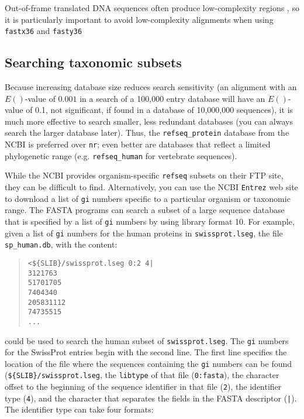\documentclass[11pt]{article}
\begin{document}
Out-of-frame translated DNA sequences often produce low-complexity
regions \cite{wrp973}, so it is particularly important to avoid
low-complexity alignments when using \texttt{fastx36} and
\texttt{fasty36}

\subsection{Searching taxonomic subsets}

Because increasing database size reduces search sensitivity (an
alignment with an $E()$-value of $0.001$ in a search of a 100,000
entry database will have an $E()$-value of 0.1, not significant, if
found in a database of 10,000,000 sequences), it is much more
effective to search smaller, less redundant databases (you can always
search the larger database later).  Thus, the \texttt{refseq\_protein}
database from the NCBI is preferred over \texttt{nr}; even better are
databases that reflect a limited phylogenetic range
(e.g. \texttt{refseq\_human} for vertebrate sequences).

While the NCBI provides organism-specific \texttt{refseq} subsets on
their FTP site, they can be difficult to find.  Alternatively, you can
use the NCBI \texttt{Entrez} web site to download a list of
\texttt{gi} numbers specific to a particular organism or taxonomic
range. The FASTA programs can search a subset of a large sequence
database that is specified by a list of \texttt{gi} numbers by using
library format 10.  For example, given a list of \texttt{gi} numbers
for the human proteins in \texttt{swissprot.lseg}, the file
\texttt{sp\_human.db}, with the content:
\begin{quote}
\begin{verbatim}
<${SLIB}/swissprot.lseg 0:2 4|
3121763
51701705
7404340
205831112
74735515
...
\end{verbatim}
\end{quote}
could be used to search the human subset of
\texttt{swissprot.lseg}. The \texttt{gi} numbers for the SwissProt
entries begin with the second line. The first line specifies the
location of the file where the sequences containing the \texttt{gi}
numbers can be found (\texttt{\$\{SLIB\}/swissprot.lseg}, the
\texttt{libtype} of that file (\texttt{0:fasta}), the character offset
to the beginning of the sequence identifier in that file (\texttt{2}),
the identifier type (\texttt{4}), and the character
that separates the fields in the FASTA descriptor (\texttt{|}).  The
identifier type can take four formats:
\end{document}
